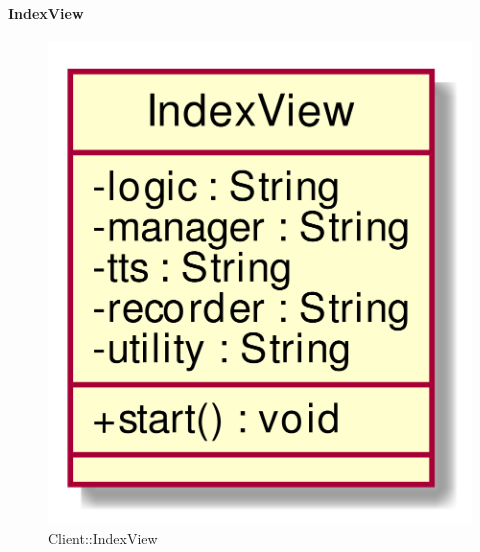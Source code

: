 \hypertarget{IndexView_label}{\paragraph{IndexView}}
\begin{figure}[h]
	\centering
	\includegraphics[width=\textwidth,height=\textheight,keepaspectratio]{images/ClassIndexView.png}
	\caption{Client::IndexView}
\end{figure}
